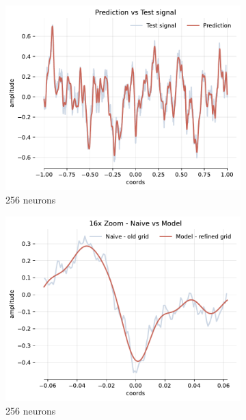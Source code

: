 \begin{figure}[h]
    \begin{subfigure}[b]{0.32\textwidth}
        \centering
        \includegraphics[width=\textwidth]{img/ch4/pred-1hl-256hf-2hz.pdf}
        \caption{256 neurons}
        \label{fig:pred-1hl-256hf-2hz}
    \end{subfigure}
    \begin{subfigure}[b]{0.32\textwidth}
        \centering
        \includegraphics[width=\textwidth]{img/ch4/16x-zoom-1hl-256hf-2hz.pdf}
        \caption{256 neurons}
        \label{fig:16x-zoom-1hl-256hf-2hz}
    \end{subfigure}
    \begin{subfigure}[b]{0.32\textwidth}

\end{subfigure}
\end{figure}
